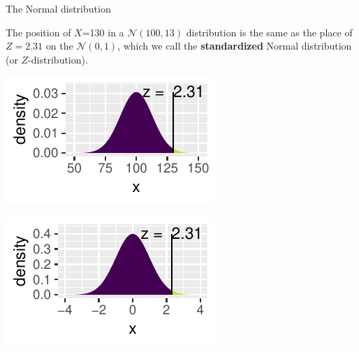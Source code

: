 \documentclass{beamer}\usepackage[]{graphicx}\usepackage[]{color}
\newenvironment{knitrout}{}{} %
\begin{document}
\begin{frame}[fragile]{The Normal distribution}

\vspace*{-.01in}

\small{The position of $X$=130 in a $\mathcal{N}(100,13)$ distribution is the same as
the place of $Z=2.31$ on the $\mathcal{N}(0,1)$, which we call the \textbf{standardized} Normal distribution (or	$Z$-distribution).}
	

\begin{knitrout}\scriptsize
{}\color{fgcolor}

{\centering \includegraphics[width=0.55\linewidth]{figure/probs-1} 

}




{\centering \includegraphics[width=0.55\linewidth]{figure/probs-2} 

}



\end{knitrout}

\end{frame} 

\end{document}
